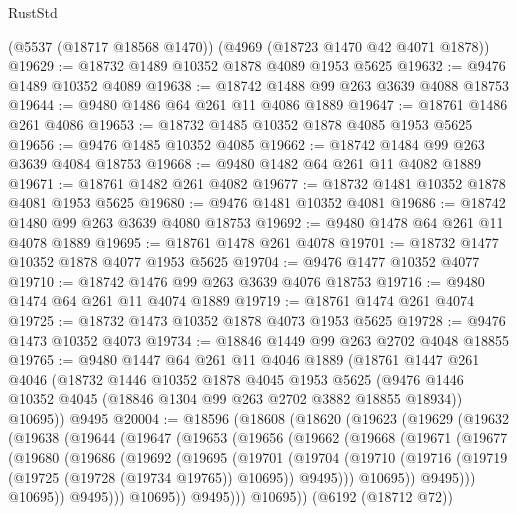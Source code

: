 \begin{lexlean}{RustStd}
\begin{coremodule}
    (@5537 (@18717 @18568 @1470))
    (@4969 (@18723 @1470 @42 @4071 @1878))
@19629 := @18732 @1489 @10352 @1878 @4089 @1953 @5625
@19632 := @9476 @1489 @10352 @4089
@19638 := @18742 @1488 @99 @263 @3639 @4088 @18753
@19644 := @9480 @1486 @64 @261 @11 @4086 @1889
@19647 := @18761 @1486 @261 @4086
@19653 := @18732 @1485 @10352 @1878 @4085 @1953 @5625
@19656 := @9476 @1485 @10352 @4085
@19662 := @18742 @1484 @99 @263 @3639 @4084 @18753
@19668 := @9480 @1482 @64 @261 @11 @4082 @1889
@19671 := @18761 @1482 @261 @4082
@19677 := @18732 @1481 @10352 @1878 @4081 @1953 @5625
@19680 := @9476 @1481 @10352 @4081
@19686 := @18742 @1480 @99 @263 @3639 @4080 @18753
@19692 := @9480 @1478 @64 @261 @11 @4078 @1889
@19695 := @18761 @1478 @261 @4078
@19701 := @18732 @1477 @10352 @1878 @4077 @1953 @5625
@19704 := @9476 @1477 @10352 @4077
@19710 := @18742 @1476 @99 @263 @3639 @4076 @18753
@19716 := @9480 @1474 @64 @261 @11 @4074 @1889
@19719 := @18761 @1474 @261 @4074
@19725 := @18732 @1473 @10352 @1878 @4073 @1953 @5625
@19728 := @9476 @1473 @10352 @4073
@19734 := @18846 @1449 @99 @263 @2702 @4048 @18855
@19765 := @9480
    @1447
    @64
    @261
    @11
    @4046
    @1889
    (@18761
      @1447
      @261
      @4046
      (@18732
        @1446
        @10352
        @1878
        @4045
        @1953
        @5625
        (@9476 @1446 @10352 @4045 (@18846 @1304 @99 @263 @2702 @3882 @18855 @18934))
        @10695))
    @9495
@20004 := @18596
    (@18608
      (@18620
        (@19623
          (@19629
            (@19632
              (@19638
                (@19644
                  (@19647
                    (@19653
                      (@19656
                        (@19662
                          (@19668
                            (@19671
                              (@19677
                                (@19680
                                  (@19686
                                    (@19692
                                      (@19695
                                        (@19701
                                          (@19704
                                            (@19710
                                              (@19716
                                                (@19719 (@19725 (@19728 (@19734 @19765)) @10695))
                                                @9495)))
                                          @10695))
                                      @9495)))
                                @10695))
                            @9495)))
                      @10695))
                  @9495)))
            @10695))
        (@6192 (@18712 @72))

\end{coremodule}
\end{lexlean}
